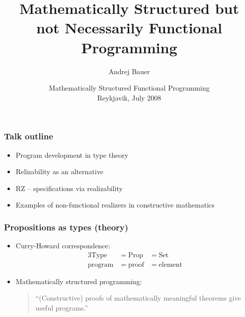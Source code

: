 \documentclass[t]{beamer}
\title{Mathematically Structured but\\
not Necessarily Functional Programming}
\author{Andrej Bauer}
\institute{Department of Mathematics and Physics\\
  University of Ljubljana, Slovenia}
\date{Mathematically Structured Functional Programming\\Reykjavik, July 2008}
\begin{document}
\begin{frame}
  \titlepage
\end{frame}

\begin{frame}
  \frametitle{Talk outline}

  \begin{itemize}
  \item Program development in type theory
  \item Relizability as an alternative
  \item RZ -- specifications via realizability
  \item Examples of non-functional realizers in constructive mathematics
  \end{itemize}
\end{frame}

\begin{frame}
  \frametitle{Propositions as types (theory)}

  \begin{itemize}
  \item Curry-Howard correspondence:
    \begin{alignat*}{3}
      \mathrm{Type} &= \mathrm{Prop} &= \mathrm{Set} \\
      \mathrm{program} &= \mathrm{proof} &= \mathrm{element}
    \end{alignat*}
  \item Mathematically structured programming:
    \begin{quote}
      ``(Constructive) proofs of mathematically meaningful theorems
      give useful programs.''
    \end{quote}
  \end{itemize}
\end{frame}
\end{document}
